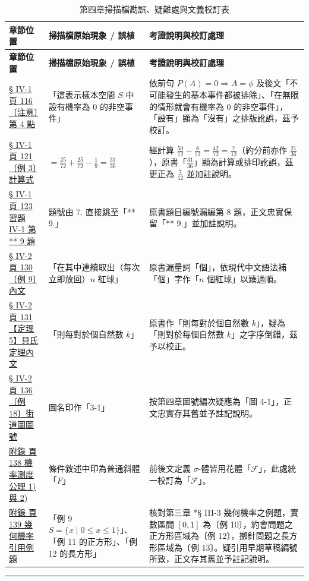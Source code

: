 \documentclass[a4paper,12pt,twoside]{article}
\begin{document}
\small
\renewcommand{\arraystretch}{1.35}
\begin{xltabular}{\textwidth}{|p{3.2cm}|p{3.8cm}|X|}
\caption{第四章掃描檔勘誤、疑難處與文義校訂表}\label{tab:errata_b5_ch4} \\
\hline
\textbf{章節位置} & \textbf{掃描檔原始現象 / 誤植} & \textbf{考證說明與校訂處理} \\ \hline
\endfirsthead
\hline
\textbf{章節位置} & \textbf{掃描檔原始現象 / 誤植} & \textbf{考證說明與校訂處理} \\ \hline
\endhead
\hline
\endfoot

\hyperref[note:b5s-ch4-p116-meiyou]{§ IV-1 頁 116 〔注意〕第 4 點} & 
「這表示樣本空間 $S$ 中設有機率為 0 的非空事件」 & 
依前句 $P(A) = 0 \Longrightarrow A = \phi$ 及後文「不可能發生的基本事件都被排除」、「在無限的情形就會有機率為 0 的非空事件」，「設有」顯為「沒有」之排版訛誤，茲予校訂。 \\ \hline

\hyperref[note:b5s-ch4-p121-calc]{§ IV-1 頁 121 〔例 3〕計算式} & 
$= \frac{25}{72} + \frac{25}{72} - \frac{1}{9} = \frac{31}{36}$ & 
經計算 $\frac{50}{72} - \frac{8}{72} = \frac{42}{72} = \frac{7}{12}$（約分前亦作 $\frac{21}{36}$），原書「$\frac{31}{36}$」顯為計算或排印訛誤，茲更正為 $\frac{7}{12}$ 並加註說明。 \\ \hline

\hyperref[note:b5s-ch4-p123-q8]{§ IV-1 頁 123 習題 IV-1 第 ** 9 題} & 
題號由 7. 直接跳至「** 9.」 & 
原書題目編號漏編第 8 題，正文忠實保留「** 9.」並加註說明。 \\ \hline

\hyperref[note:b5s-ch4-ex9-ge]{§ IV-2 頁 130 〔例 9〕內文} & 
「在其中連續取出（每次立即放回）$n$ 紅球」 & 
原書漏量詞「個」，依現代中文語法補「個」字作「$n$ 個紅球」以臻通順。 \\ \hline

\hyperref[note:b5s-ch4-bayes-typo]{§ IV-2 頁 131 【定理 5】貝氏定理內文} & 
「則每對於個自然數 $k$」 & 
原書作「則每對於個自然數 $k$」，疑為「則對於每個自然數 $k$」之字序倒錯，茲予以校正。 \\ \hline

\hyperref[note:b5s-ch4-p136-fig-num]{§ IV-2 頁 136 〔例 18〕街道圖圖號} & 
圖名印作「3-1」 & 
按第四章圖號編次疑應為「圖 4-1」，正文忠實存其舊並予註記說明。 \\ \hline

\hyperref[note:b5s-ch4-p138-f-font]{附錄 頁 138 機率測度公理 1) 與 2)} & 
條件敘述中印為普通斜體「$F$」 & 
前後文定義 $\sigma$-體皆用花體「$\mathscr{F}$」，此處統一校訂為「$\mathscr{F}$」。 \\ \hline

\hyperref[note:b5s-ch4-p139-geom-ex-num]{附錄 頁 139 幾何機率引用例題} & 
「例 9 $S=\{x \mid 0 \le x \le 1\}$」、「例 11 的正方形」、「例 12 的長方形」 & 
核對第三章 *§ III-3 幾何機率之例題，實數區間 $[0,1]$ 為〔例 10〕，約會問題之正方形區域為〔例 12〕，擲針問題之長方形區域為〔例 13〕。疑引用早期草稿編號所致，正文存其舊並予註記說明。 \\ \hline

\end{xltabular}

\vspace{1em}
\hrule
\vspace{1em}

\tableofcontents
\newpage


\end{document}
